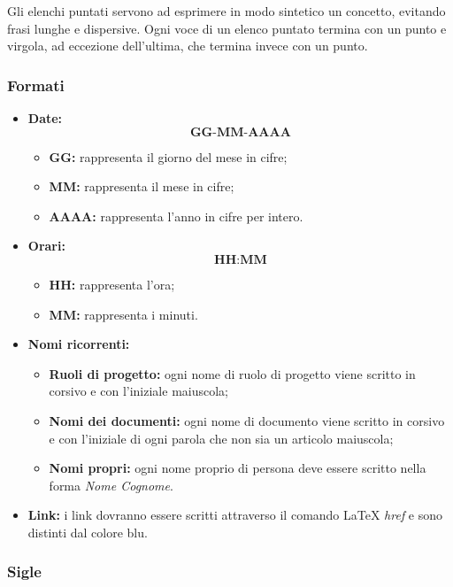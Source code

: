 \documentclass[../NormediProgetto.tex]{subfiles}
\begin{document}
Gli elenchi puntati servono ad esprimere in modo sintetico un concetto, evitando frasi lunghe e dispersive. Ogni voce di un elenco puntato termina con un punto e virgola, ad eccezione dell’ultima, che termina invece con un punto.

\subsubsection{Formati}

\begin{itemize}

\item{\textbf{Date:}}  \[\textbf{GG-MM-AAAA}\]
\begin{itemize}
\item{\textbf{GG:}} rappresenta il giorno del mese in cifre;
\item{\textbf{MM:}} rappresenta il mese in cifre;
\item{\textbf{AAAA:}} rappresenta l'anno in cifre per intero.

\end{itemize}

\item{\textbf{Orari:}} \[\textbf{HH:MM}\]
\begin{itemize}
\item{\textbf{HH:}} rappresenta l'ora;
\item{\textbf{MM:}} rappresenta i minuti.
\end{itemize}

\item{\textbf{Nomi ricorrenti:}}
\begin{itemize}
\item{\textbf{Ruoli di progetto:}} ogni nome di ruolo di progetto viene scritto in corsivo e con l’iniziale maiuscola;
\item{\textbf{Nomi dei documenti:}} ogni nome di documento viene scritto in corsivo e con l’iniziale di ogni parola che non sia un articolo maiuscola;
\item{\textbf{Nomi propri:}} ogni nome proprio di persona deve essere scritto nella forma \textit{Nome Cognome}.
\end{itemize}

\item{\textbf{Link:}} i link dovranno essere scritti attraverso il comando \LaTeX{} \textit{href} e sono distinti dal colore blu.
\end{itemize}

\subsubsection{Sigle}
\end{document}
